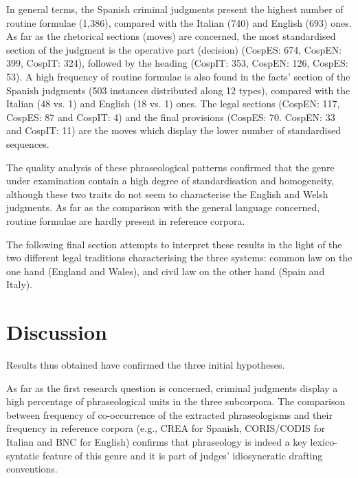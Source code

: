 \documentclass[output=paper]{LSP/langsci}
\begin{document}
In general terms, the Spanish criminal judgments present the highest number of routine formulae (1,386), compared with the Italian (740) and English (693) ones. As far as the rhetorical sections (moves) are concerned, the most standardised section of the judgment is the operative part (decision) (CospES: 674, CospEN: 399, CospIT: 324), followed by the heading (CospIT: 353, CospEN: 126, CospES: 53). A high frequency of routine formulae is also found in the facts’ section of the Spanish judgments (503 instances distributed along 12 types), compared with the Italian (48 vs. 1) and English (18 vs. 1) ones. The legal sections (CospEN: 117, CospES: 87 and CospIT: 4) and the final provisions (CospES: 70. CospEN: 33 and CospIT: 11) are the moves which display the lower number of standardised sequences.

The quality analysis of these phraseological patterns \citep[255-261]{
Pontrandolfo2013b} confirmed that the genre under examination contain a high degree of standardisation and homogeneity, although these two traits do not seem to characterise the English and Welsh judgments. As far as the comparison with the general language concerned, routine formulae are hardly present in reference corpora.

The following final section attempts to interpret these results in the light of the two different legal traditions characterising the three systems: common law on the one hand (England and Wales), and civil law on the other hand (Spain and Italy).

\section{Discussion}
Results thus obtained have confirmed the three initial hypotheses.

As far as the first research question is concerned, criminal judgments display a high percentage of phraseological units in the three subcorpora. The comparison between frequency of co-occurrence of the extracted phraseologisms and their frequency in reference corpora (e.g., CREA for Spanish, CORIS/CODIS for Italian and BNC for English) confirms that phraseology is indeed a key lexico-syntatic feature of this genre and it is part of judges’ idiosyncratic drafting conventions.
 
\end{document}
